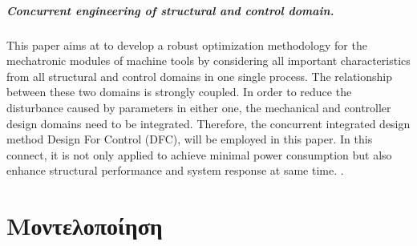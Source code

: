 \documentclass[a4paper,12pt,twoside]{report}
\begin{document}
{			\paragraph{Concurrent engineering of structural and control domain.} {This paper aims at to develop a robust optimization methodology for the mechatronic modules of machine tools by considering all important characteristics from all structural and control domains in one single process. The relationship between these two domains is strongly coupled. In order to reduce the disturbance caused by parameters in either one, the mechanical and controller design domains need to be integrated. Therefore, the concurrent integrated design method Design For Control (DFC), will be employed in this paper. In this connect, it is not only applied to achieve minimal power consumption but also enhance structural performance and system response at same time. \cite{IntegratedDesignForAMechatronicFeedDriveSystemOfMachineTools:Chen2005}.
			}


	\chapter{Μοντελοποίηση}
}
\end{document}
